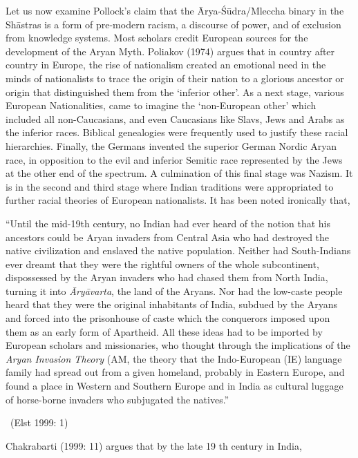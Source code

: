 Let us now examine Pollock’s claim that the Ārya-Śūdra/Mleccha binary in the Shāstras is a form of pre-modern racism, a discourse of power, and of exclusion from knowledge systems. Most scholars credit European sources for the development of the Aryan Myth. Poliakov (1974) argues that in country after country in Europe, the rise of nationalism created an emotional need in the minds of nationalists to trace the origin of their nation to a glorious ancestor or origin that distinguished them from the ‘inferior other’. As a next stage, various European Nationalities, came to imagine the ‘non-European other’ which included all non-Caucasians, and even Caucasians like Slavs, Jews and Arabs as the inferior races. Biblical genealogies were frequently used to justify these racial hierarchies. Finally, the Germans invented the superior German Nordic Aryan race, in opposition to the evil and inferior Semitic race represented by the Jews at the other end of the spectrum. A culmination of this final stage was Nazism. It is in the second and third stage where Indian traditions were appropriated to further racial theories of European nationalists. It has been noted ironically that,

\begin{myquote}
“Until the mid-19th century, no Indian had ever heard of the notion that his ancestors could be Aryan invaders from Central Asia who had destroyed the native civilization and enslaved the native population. Neither had South-Indians ever dreamt that they were the rightful owners of the whole subcontinent, dispossessed by the Aryan invaders who had chased them from North India, turning it into \textit{Āryāvarta}, the land of the Aryans. Nor had the low-caste people heard that they were the original inhabitants of India, subdued by the Aryans and forced into the prisonhouse of caste which the conquerors imposed upon them as an early form of Apartheid. All these ideas had to be imported by European scholars and missionaries, who thought through the implications of the \textit{Aryan Invasion Theory} (AM, the theory that the Indo-European (IE) language family had spread out from a given homeland, probably in Eastern Europe, and found a place in Western and Southern Europe and in India as cultural luggage of horse-borne invaders who subjugated the natives.” 

~\hfill (Elst 1999: 1)
\end{myquote}

Chakrabarti (1999: 11) argues that by the late 19 th century in India,

